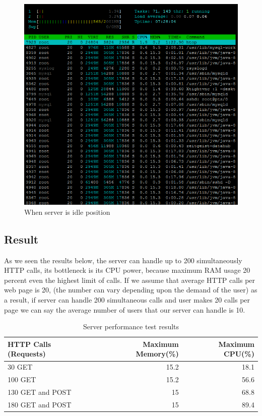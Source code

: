 \begin{figure}[!htbp]
\centering
\includegraphics[width=\textwidth]{projectChapters/images/serveridle.png}
\caption{When server is idle position}
\label{fig:serveridle}
\end{figure}

\subsection{Result}




As we seen the results below, the server can handle up to 200 simultaneously HTTP calls, its bottleneck is its CPU power, because maximum RAM usage 20 percent even the highest limit of calls. If we assume that average HTTP calls per web page is 20, (the number can vary depending upon the demand of the user) as a result, if server can handle 200 simultaneous calls and user makes 20 calls per page we can say the average number of users that our server can handle is 10.

\newpage
\begin{table}[!ht]
\centering
\caption{Server performance test results}
\label{my-label}
\begin{tabular}{|l|r|r|}
\hline
\textbf{HTTP Calls (Requests)}                & \textbf{Maximum Memory(\%)} & \textbf{Maximum CPU(\%)} \\ \hline
30 GET           & 15.2                     & 18.1  \\ \hline
100 GET          & 15.2                     & 56.6  \\ \hline
130 GET and POST& 15                       & 68.8  \\ \hline
180 GET and POST& 15                       & 89.4  \\ \hline
\end{tabular}
\end{table}

